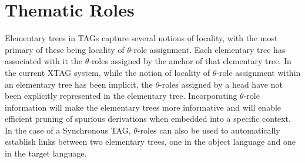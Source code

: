 
\section{Thematic Roles}

Elementary trees in TAGs capture several notions of locality, with the most
primary of these being locality of $\theta$-role assignment.  Each elementary
tree has associated with it the $\theta$-roles assigned by the anchor of that
elementary tree.  In the current XTAG system, while the notion of locality of
$\theta$-role assignment within an elementary tree has been implicit, the
$\theta$-roles assigned by a head have not been explicitly represented in the
elementary tree. Incorporating $\theta$-role information will make the
elementary trees more informative and will enable efficient pruning of spurious
derivations when embedded into a specific context.  In the case of a
Synchronous TAG, $\theta$-roles can also be used to automatically establish
links between two elementary trees, one in the object language and one in the
target language.





















